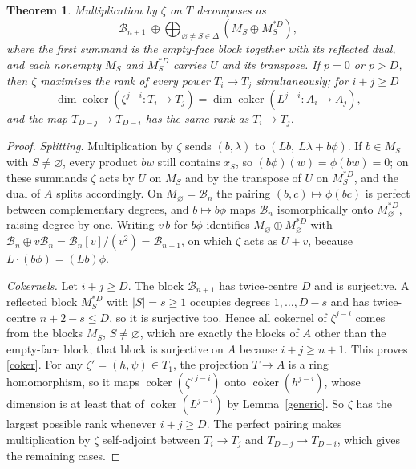 \documentclass[11pt,a4paper]{article}
\newtheorem{theorem}{Theorem}[section]
\theoremstyle{definition}
\newcommand{\cok}{\operatorname{coker}}
\newcommand{\B}{\mathcal B}
\begin{document}
\begin{theorem}\label{ideal}
Multiplication by $\zeta$ on $T$ decomposes as
\begin{equation}\label{idealform}
 \B_{n+1}\ \oplus\bigoplus_{\varnothing\ne S\in\Delta}\left(M_S\oplus M_S^{*D}\right),
\end{equation}
where the first summand is the empty-face block together with its reflected dual, and each nonempty $M_S$ and $M_S^{*D}$ carries $U$ and its transpose. If $p=0$ or $p>D$, then $\zeta$ maximises the rank of every power $T_i\to T_j$ simultaneously; for $i+j\ge D$
\begin{equation}\label{coker}
 \dim\cok(\zeta^{j-i}:T_i\to T_j)=\dim\cok(L^{j-i}:A_i\to A_j),
\end{equation}
and the map $T_{D-j}\to T_{D-i}$ has the same rank as $T_i\to T_j$.
\end{theorem}
\begin{proof}
\emph{Splitting.} Multiplication by $\zeta$ sends $(b,\lambda)$ to $(Lb,\ L\lambda+b\phi)$. If $b\in M_S$ with $S\ne\varnothing$, every product $bw$ still contains $x_S$, so $(b\phi)(w)=\phi(bw)=0$; on these summands $\zeta$ acts by $U$ on $M_S$ and by the transpose of $U$ on $M_S^{*D}$, and the dual of $A$ splits accordingly. On $M_\varnothing=\B_n$ the pairing $(b,c)\mapsto\phi(bc)$ is perfect between complementary degrees, and $b\mapsto b\phi$ maps $\B_n$ isomorphically onto $M_\varnothing^{*D}$, raising degree by one. Writing $v\,b$ for $b\phi$ identifies $M_\varnothing\oplus M_\varnothing^{*D}$ with $\B_n\oplus v\B_n=\B_n[v]/(v^2)=\B_{n+1}$, on which $\zeta$ acts as $U+v$, because $L\cdot(b\phi)=(Lb)\phi$.

\emph{Cokernels.} Let $i+j\ge D$. The block $\B_{n+1}$ has twice-centre $D$ and is surjective. A reflected block $M_S^{*D}$ with $|S|=s\ge1$ occupies degrees $1,\dots,D-s$ and has twice-centre $n+2-s\le D$, so it is surjective too. Hence all cokernel of $\zeta^{j-i}$ comes from the blocks $M_S$, $S\ne\varnothing$, which are exactly the blocks of $A$ other than the empty-face block; that block is surjective on $A$ because $i+j\ge n+1$. This proves \eqref{coker}. For any $\zeta'=(h,\psi)\in T_1$, the projection $T\to A$ is a ring homomorphism, so it maps $\cok(\zeta'^{\,j-i})$ onto $\cok(h^{j-i})$, whose dimension is at least that of $\cok(L^{j-i})$ by Lemma~\ref{generic}. So $\zeta$ has the largest possible rank whenever $i+j\ge D$. The perfect pairing makes multiplication by $\zeta$ self-adjoint between $T_i\to T_j$ and $T_{D-j}\to T_{D-i}$, which gives the remaining cases.
\end{proof}
\end{document}
